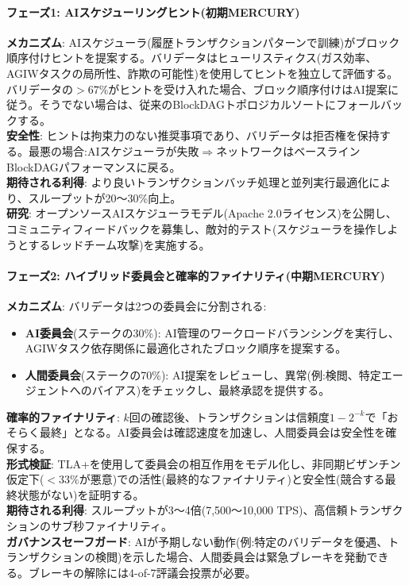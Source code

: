 \documentclass[11pt]{article}
\begin{document}
\paragraph{フェーズ1: AIスケジューリングヒント(初期MERCURY)}
\textbf{メカニズム}: AIスケジューラ(履歴トランザクションパターンで訓練)がブロック順序付けヒントを提案する。バリデータはヒューリスティクス(ガス効率、AGIWタスクの局所性、詐欺の可能性)を使用してヒントを独立して評価する。バリデータの$>67\%$がヒントを受け入れた場合、ブロック順序付けはAI提案に従う。そうでない場合は、従来のBlockDAGトポロジカルソートにフォールバックする。\\
\textbf{安全性}: ヒントは拘束力のない推奨事項であり、バリデータは拒否権を保持する。最悪の場合:AIスケジューラが失敗$\Rightarrow$ネットワークはベースラインBlockDAGパフォーマンスに戻る。\\
\textbf{期待される利得}: より良いトランザクションバッチ処理と並列実行最適化により、スループットが20〜30\%向上。\\
\textbf{研究}: オープンソースAIスケジューラモデル(Apache 2.0ライセンス)を公開し、コミュニティフィードバックを募集し、敵対的テスト(スケジューラを操作しようとするレッドチーム攻撃)を実施する。

\paragraph{フェーズ2: ハイブリッド委員会と確率的ファイナリティ(中期MERCURY)}
\textbf{メカニズム}: バリデータは2つの委員会に分割される:
\begin{itemize}[noitemsep]
  \item \textbf{AI委員会}(ステークの30\%): AI管理のワークロードバランシングを実行し、AGIWタスク依存関係に最適化されたブロック順序を提案する。
  \item \textbf{人間委員会}(ステークの70\%): AI提案をレビューし、異常(例:検閲、特定エージェントへのバイアス)をチェックし、最終承認を提供する。
\end{itemize}
\textbf{確率的ファイナリティ}: $k$回の確認後、トランザクションは信頼度$1 - 2^{-k}$で「おそらく最終」となる。AI委員会は確認速度を加速し、人間委員会は安全性を確保する。\\
\textbf{形式検証}: TLA+を使用して委員会の相互作用をモデル化し、非同期ビザンチン仮定下($<33\%$が悪意)での活性(最終的なファイナリティ)と安全性(競合する最終状態がない)を証明する。\\
\textbf{期待される利得}: スループットが3〜4倍(7,500〜10,000 TPS)、高信頼トランザクションのサブ秒ファイナリティ。\\
\textbf{ガバナンスセーフガード}: AIが予期しない動作(例:特定のバリデータを優遇、トランザクションの検閲)を示した場合、人間委員会は緊急ブレーキを発動できる。ブレーキの解除には4-of-7評議会投票が必要。
\end{document}
